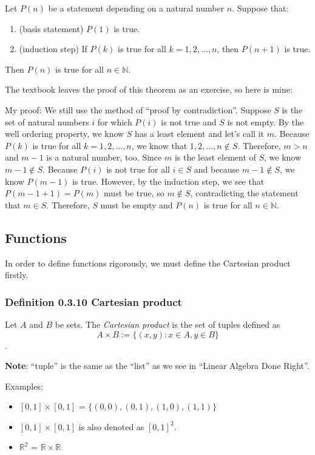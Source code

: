 \documentclass[12pt, letterpaper, oneside]{book}
\begin{document}
Let $P(n)$ be a statement depending on a natural number $n$. Suppose that:

\begin{enumerate}
  \item (basis statement) $P(1)$ is true.
  \item (induction step) If $P(k)$ is true for all $k = 1, 2, \ldots, n$, then
        $P(n+1)$ is true.
\end{enumerate}

Then $P(n)$ is true for all $n \in \mathbb{N}$.

The textbook leaves the proof of this theorem as an exercise, so here is mine:

My proof: We still use the method of ``proof by contradiction''. Suppose $S$ is
the set of natural numbers $i$ for which $P(i)$ is not true and $S$ is not
empty. By the well ordering property, we know $S$ has a least element and let's
call it $m$. Because $P(k)$ is true for all $k = 1, 2, \ldots, n$, we know that
$1, 2, \ldots, n \notin S$. Therefore, $m > n$ and $m-1$ is a natural number,
too. Since $m$ is the least element of $S$, we know $m-1 \notin S$. Because
$P(i)$ is not true for all $i \in S$ and because $m-1 \notin S$, we know
$P(m-1)$ is true. However, by the induction step, we see that $P(m-1+1) = P(m)$
must be true, so $m \notin S$, contradicting the statement that $m \in S$.
Therefore, $S$ must be empty and $P(n)$ is true for all $n \in \mathbb{N}$.

\subsection{Functions}

In order to define functions rigorously, we must define the Cartesian product
firstly.

\subsubsection{Definition 0.3.10 Cartesian product}

Let $A$ and $B$ be sets. The \textit{Cartesian product} is the set of tuples
defined as \[ A \times B := \{(x, y): x \in A, y \in B \} \].

\textbf{Note}: ``tuple'' is the same as the ``list'' as we see in ``Linear
Algebra Done Right''.

Examples:
\begin{itemize}
  \item $[0,1] \times [0,1]$ = $\{(0,0), (0,1), (1,0), (1,1)\}$
  \item $[0,1] \times [0,1]$ is also denoted as $[0,1]^2$.
  \item $\mathbb{R}^2$ = $\mathbb{R} \times \mathbb{R}$
\end{itemize}
\end{document}
